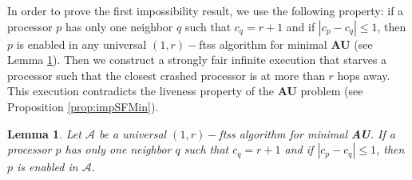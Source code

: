 \documentclass[11pt,english,letterpaper]{article}
\newtheorem{lemma}{Lemma}
\begin{document}
In order to prove the first impossibility result, we use the following property: if a processor $p$ has only one neighbor $q$ such that $c_{q}=r+1$	and if $|c_{p}-c_{q}|\leq 1$, then $p$ is enabled in any universal $(1,r)-$ftss algorithm for minimal \textbf{AU} (see Lemma \ref{lem:impSFMin}). Then we construct a strongly fair infinite execution that starves a processor such that the closest crashed processor is at more than $r$ hops away. This execution contradicts the liveness property of the \textbf{AU} problem (see Proposition \ref{prop:impSFMin}).

\begin{lemma}\label{lem:impSFMin}
Let $\mathcal{A}$ be a universal $(1,r)-$ftss algorithm for minimal \textbf{AU}. If a processor $p$ has only one neighbor $q$ such that $c_{q}=r+1$ and if $|c_{p}-c_{q}|\leq 1$, then $p$ is enabled in $\mathcal{A}$. 
\end{lemma}
\end{document}

